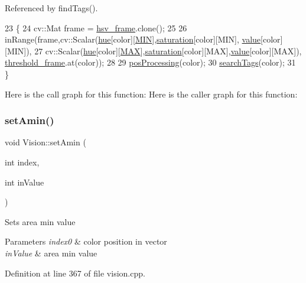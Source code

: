 Referenced by find\+Tags().


\begin{DoxyCode}
23                                        \{
24     cv::Mat frame = \hyperlink{class_vision_a1bbcad0a1286863da12d3580492b4a8d}{hsv\_frame}.clone();
25 
26     inRange(frame,cv::Scalar(\hyperlink{class_vision_a557114ed93889df7c09fe7add7a2fa1f}{hue}[color][\hyperlink{class_vision_a3824e4ab6a6c9beaceec70f7d3910ed0}{MIN}],\hyperlink{class_vision_a71a7f9859283e916a0dfb1467eaf5b13}{saturation}[color][MIN],
      \hyperlink{class_vision_ad76f296d21c0758ed68429ca8b237b03}{value}[color][MIN]),
27     cv::Scalar(\hyperlink{class_vision_a557114ed93889df7c09fe7add7a2fa1f}{hue}[color][\hyperlink{class_vision_af96e82ce8807b3c5e0651f84a04eeb9a}{MAX}],\hyperlink{class_vision_a71a7f9859283e916a0dfb1467eaf5b13}{saturation}[color][MAX],\hyperlink{class_vision_ad76f296d21c0758ed68429ca8b237b03}{value}[color][MAX]),
      \hyperlink{class_vision_a2fee2db2d4fe0cee6b2de36ee0eb6c7f}{threshold\_frame}.at(color));
28 
29     \hyperlink{class_vision_af00cb00dca3916c4beebbd140ec8b153}{posProcessing}(color);
30     \hyperlink{class_vision_a717cabba99a7e8d5613df6dc699e31fe}{searchTags}(color);
31 \}
\end{DoxyCode}
Here is the call graph for this function\+:
Here is the caller graph for this function\+:
\mbox{\label{class_vision_a15483736197991fac542022fd9652472}} 
\subsubsection{\texorpdfstring{set\+Amin()}{setAmin()}}
{\footnotesize\ttfamily void Vision\+::set\+Amin (\begin{DoxyParamCaption}\item[{int}]{index,  }\item[{int}]{in\+Value }\end{DoxyParamCaption})}

Sets area min value 
\begin{DoxyParams}{Parameters}
{\em index0} & color position in vector \\
\hline
{\em in\+Value} & area min value \\
\hline
\end{DoxyParams}


Definition at line 367 of file vision.\+cpp.



